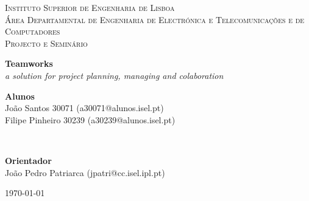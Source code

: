 ﻿\documentclass[pdftex,fontsize=20pt,a4paper]{scrbook}
\begin{document}
\begin{titlepage}
\begin{center}
\begin{minipage}{0.8\textwidth}
\begin{center}
\textsc{\scriptsize Instituto Superior de Engenharia de Lisboa}\\
\textsc{\footnotesize Área Departamental de Engenharia de Electrónica e Telecomunicações e de Computadores }\\[0.5cm]
\textsc{\footnotesize Projecto e Seminário}\\[2cm]
\vspace*{1cm}
\end{center}
\end{minipage}
{ \huge\bfseries Teamworks }\\[1cm]
{ \emph{a solution for project planning, managing and colaboration} }\\[4cm]
\begin{minipage}{1\textwidth}
\begin{center}
\textbf{\small{Alunos}}\\
\footnotesize
João Santos 30071 (a30071@alunos.isel.pt) \\
Filipe Pinheiro 30239 (a30239@alunos.isel.pt)
\end{center}
\end{minipage}\\[0.5cm]
\begin{minipage}{1\textwidth}
\begin{center}
\textbf{\small{Orientador}}\\
\footnotesize
João Pedro Patriarca (jpatri@cc.isel.ipl.pt)
\end{center}
\end{minipage}
\vfill
{\footnotesize \today}
\end{center}
\end{titlepage}
\clearpage
\end{document}
